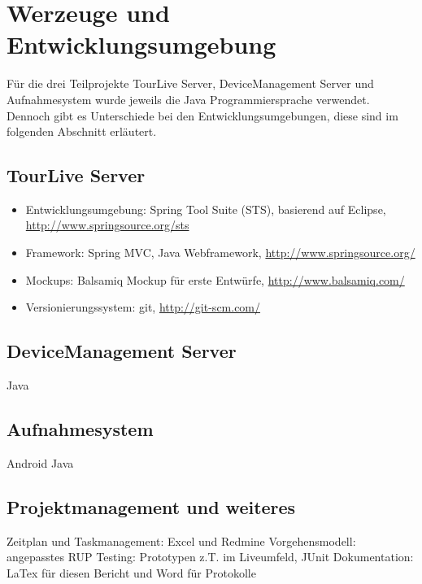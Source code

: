 \section{Werzeuge und Entwicklungsumgebung}
Für die drei Teilprojekte TourLive Server, DeviceManagement Server und Aufnahmesystem wurde jeweils die Java Programmiersprache verwendet. Dennoch gibt es Unterschiede bei den Entwicklungsumgebungen, diese sind im folgenden Abschnitt erläutert.
\subsection{TourLive Server}
\begin{itemize}
\item Entwicklungsumgebung: Spring Tool Suite (STS), basierend auf Eclipse, \url{http://www.springsource.org/sts}
\item Framework: Spring MVC, Java Webframework, \url{http://www.springsource.org/}
\item Mockups: Balsamiq Mockup für erste Entwürfe, \url{http://www.balsamiq.com/}
\item Versionierungssystem: git, \url{http://git-scm.com/}
\end{itemize}

\subsection{DeviceManagement Server}
Java

\subsection{Aufnahmesystem}
Android Java

\subsection{Projektmanagement und weiteres}
Zeitplan und Taskmanagement: Excel und Redmine
Vorgehensmodell: angepasstes RUP
Testing: Prototypen z.T. im Liveumfeld, JUnit
Dokumentation: LaTex für diesen Bericht und Word für Protokolle